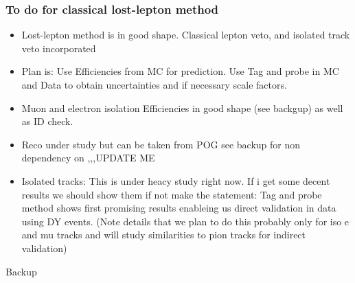 \documentclass{beamer}
\begin{document}
\begin{frame}
 \frametitle{To do for classical lost-lepton method}
 \begin{itemize}
  \item Lost-lepton method is in good shape. Classical lepton veto, and isolated track veto incorporated
  \item Plan is: Use Efficiencies from MC for prediction. Use Tag and probe in MC and Data to obtain uncertainties and if necessary scale factors.
  \item Muon and electron isolation Efficiencies in good shape (see backgup) as well as ID check.
  \item Reco under study but can be taken from POG see backup for non dependency on \HT,\MHT,\NJets,\BTags UPDATE ME
  \item Isolated tracks: This is under heacy study right now. If i get some decent results we should show them if not make the statement: Tag and probe method shows first promising results enableing us direct validation in data using DY events. (Note details that we plan to do this probably only for iso e and mu tracks and will study similarities to pion tracks for indirect validation)
 \end{itemize}

\end{frame}

\begin{frame}
 \begin{block}{}
 \centering
 \Large Backup
 \end{block}
\end{frame}
\end{document}
